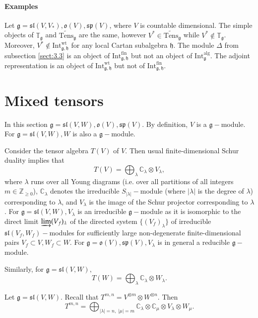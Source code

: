 \documentclass[10pt]{amsart}
\newcommand {\ZZ} {\mathbb {Z}}
\newcommand {\CC} {\mathbb {C}}
\newcommand{\TT}{\mathbb{T}}
\newcommand{\wt}{\mathrm{wt}}
\renewcommand{\sp}{\mathfrak{sp}}
\renewcommand{\sl}{\mathfrak{sl}}
\newcommand{\oo}{\mathfrak{o}}
\newcommand{\hh}{\mathfrak{h}}
\renewcommand{\gg}{\mathfrak{g}}
\newcommand{\Int}{\mathrm{Int}}
\newcommand{\alg}{\mathrm{alg}}
\newcommand{\fin}{\mathrm{fin}}
\begin{document}
\paragraph{\textbf{Examples}}

  Let $\gg = \sl(V,V_*), \oo(V), \sp(V)$, where $V$ is countable dimensional. The simple objects of $\TT_\gg$ and $\widetilde{\mathrm{Tens}}_\gg$ are the same, however $V^* \in \widetilde{\mathrm{Tens}}_\gg$ while $V^* \notin \TT_\gg$. Moreover, $V^* \notin \mathrm{Int}^{\wt}_{\gg,\hh}$ for any local Cartan subalgebra $\hh$. The module $\Delta$ from subsection \ref{sect:3.3} is an object of $\mathrm{Int}_{\gg,\hh}^\fin$ but not an object of $\mathrm{Int}_\gg^\alg$.  The adjoint representation is an object of $\mathrm{Int}^{\wt}_{\gg,\hh}$ but not of $\Int_{\gg,\hh}^\fin$.

\section{Mixed tensors}\label{sect:4}
In this section $\gg = \sl(V,W), \oo(V), \sp(V)$. By definition, $V$ is a $\gg-$module. For $\gg = \sl(V,W), W$ is also a $\gg-$module.

Consider the tensor algebra $T(V)$ of $V$. Then usual finite-dimensional Schur duality implies that
\begin{equation}\label{schur_imp}
 T(V)=\bigoplus_{\lambda}\CC_{\lambda} \otimes V_{\lambda}, 
\end{equation}
where $\lambda$ runs over all Young diagrams (i.e. over all partitions of all integers $m \in \ZZ_{\geq 0}$), $\CC_{\lambda}$ denotes the irreducible $S_{|\lambda|}-$module (where $|\lambda|$ is the degree of $\lambda$) corresponding to $\lambda$, and $V_{\lambda}$ is the image of the Schur projector corresponding to $\lambda$. For $\gg = \sl(V,W), V_{\lambda}$ is an irreducible $\gg-$module as it is isomorphic to the direct limit $\varinjlim(V_f)_{\lambda}$ of the directed system $\{(V_f)_\lambda\}$ of irreducible $\sl(V_f,W_f)-$modules for sufficiently large non-degenerate finite-dimensional pairs $V_f \subset V, W_f \subset W$. For $\gg=\oo(V), \sp(V), V_{\lambda}$ is in general a reducible $\gg-$module.

Similarly, for $\gg = \sl(V,W),$
\begin{equation}\label{schur_imp1}
 T(W)=\bigoplus_{\lambda}\CC_{\lambda} \otimes W_{\lambda}.
\end{equation}

Let $\gg = \sl(V,W)$. Recall that $T^{m,n}=V^{\otimes m}\otimes W^{\otimes n}$.
Then
\begin{equation}
 T^{m,n} = \bigoplus_{|\lambda|=n, \; |\mu| = m} \CC_{\lambda} \otimes \CC_{\mu} \otimes V_{\lambda} \otimes W_{\mu}.
\end{equation}
\end{document}
